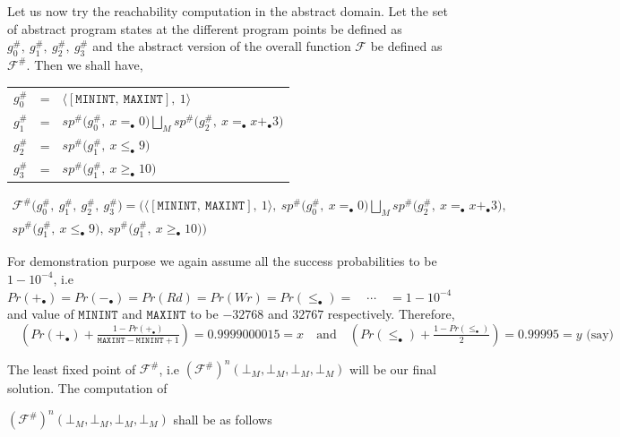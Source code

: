 \documentclass[final,3p, review, times]{Elsevier/elsarticle}
\begin{document}
Let us now try the reachability computation in the abstract domain. Let the set of abstract program states at the different program points be defined as $g_0^\#,\ g_1^\#,\ g_2^\#,\ g_3^\#$ and the abstract version of the overall function $\mathcal{F}$ be defined as $\mathcal{F}^\#$. Then we shall have,\\

\begin{tabular}{lcl}
$g_0^\#$ & = & $\big\langle[\mathtt{MININT},\ \mathtt{MAXINT}],\ 1\big\rangle$ \\
$g_1^\#$ & = & $\displaystyle sp^\#\big(g_0^\#,\ x =_\bullet 0\big)\bigsqcup_M sp^\#\big(g_2^\#,\ x =_\bullet x +_\bullet 3\big)$ \\
$g_2^\#$ & = & $sp^\#\big(g_1^\#,\ x \leq_\bullet 9\big)$ \\
$g_3^\#$ & = & $sp^\#\big(g_1^\#,\ x \geq_\bullet 10\big)$ \\
\end{tabular}

\begin{multline*}
  \mathcal{F}^\#\Big(g_0^\#,\ g_1^\#,\ g_2^\#,\ g_3^\#\Big)=\Big(\big\langle[\mathtt{MININT},\ \mathtt{MAXINT}],\ 1\big\rangle,\ sp^\#\big(g_0^\#,\ x =_\bullet 0\big)\bigsqcup_M sp^\#\big(g_2^\#,\ x =_\bullet x +_\bullet 3\big),\\
  sp^\#\big(g_1^\#,\ x\leq_\bullet 9\big),\ sp^\#\big(g_1^\#,\ x\geq_\bullet 10\big)\Big)
\end{multline*}

For demonstration purpose we again assume all the success probabilities to be $1-10^{-4}$, i.e $Pr(+_\bullet)=Pr(-_\bullet)=Pr(Rd)=Pr(Wr)=Pr(\leq_\bullet)=\quad\cdots\quad=1-10^{-4}$ and value of $\mathtt{MININT}$ and $\mathtt{MAXINT}$ to be $-32768$ and $32767$ respectively. Therefore, $\displaystyle\quad\left(Pr(+_\bullet)+\frac{1-Pr(+_\bullet)}{\mathtt{MAXINT}-\mathtt{MININT}+1}\right)=0.9999000015=x\quad\text{and}\quad\left(Pr(\leq_\bullet)+\frac{1-Pr(\leq_\bullet)}{2}\right)=0.99995=y\text{ (say)}$

The least fixed point of $\mathcal{F^\#}$, i.e $(\mathcal{F^\#})^n(\bot_M, \bot_M, \bot_M, \bot_M)$ will be our final solution. The computation of

\noindent$(\mathcal{F^\#})^n(\bot_M, \bot_M, \bot_M, \bot_M)$ shall be as follows
\end{document}
